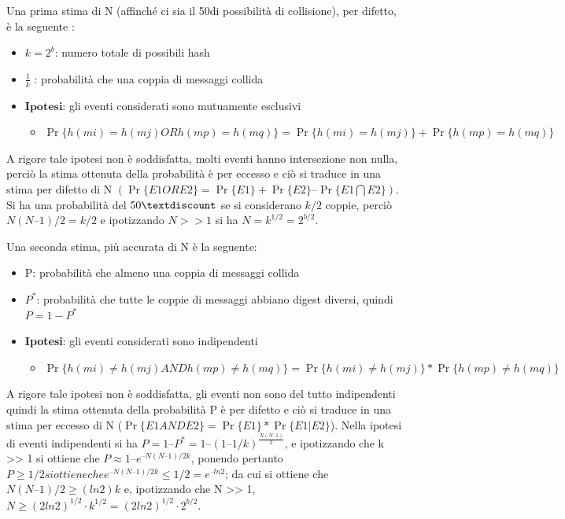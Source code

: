 Una prima stima di N (affinché ci sia il 50\textdiscount di possibilità di collisione), per difetto, è la seguente :
\begin{itemize}
\item $k = 2^{b}$: numero totale di possibili hash
\item $\frac{1}{k}$ : probabilità che una coppia di messaggi collida
\item $\textbf{Ipotesi}$: gli eventi considerati sono mutuamente esclusivi 
	\begin{itemize}
		\item $\Pr\{h(mi) = h(mj) \textit{OR} h(mp) = h(mq)\} = \Pr\{h(mi) = h(mj)\} + \Pr\{ h(mp) = h(mq)\}$
	\end{itemize}
\end{itemize}
 
A rigore tale ipotesi non è soddisfatta, molti eventi hanno intersezione non nulla, perciò la stima ottenuta della probabilità è per eccesso e ciò si traduce in una stima per difetto di N $(\Pr\{E1 OR E2\} = \Pr\{E1\} + \Pr\{E2\} – \Pr\{E1 \bigcap E2\})$.
Si ha una probabilità del $50\textdiscount$ se si considerano $k/2$ coppie, perciò $N(N – 1)/2 = k/2$ e ipotizzando $N >> 1$ si ha $N = k^{1/2} = 2^{b/2}$.

Una seconda stima, più accurata di N è la seguente:
\begin{itemize}
\item P: probabilità che almeno una coppia di messaggi collida
\item $P^{*}$: probabilità che tutte le coppie di messaggi abbiano digest diversi, quindi $P = 1 - P^{*}$
\item \textbf{Ipotesi}: gli eventi considerati sono indipendenti
	\begin{itemize}
		\item $\Pr\{h(mi) \neq h(mj) \textit{AND} h(mp) \neq h(mq)\} = \Pr\{h(mi) \neq h(mj)\} * \Pr\{ h(mp) \neq h(mq)\}$
	\end{itemize}
\end{itemize}

A rigore tale ipotesi non è soddisfatta, gli eventi non sono del tutto indipendenti quindi la stima ottenuta della probabilità P è per difetto e ciò si traduce in una stima per eccesso di N ($\Pr\{E1 AND E2\} = \Pr\{E1\} * \Pr\{E1|E2\}$).
Nella ipotesi di eventi indipendenti si ha $P = 1 – P^{*} = 1 – (1 – 1/k)^{\frac{N(N – 1)}{2}}$, e ipotizzando che k >> 1 si ottiene che $P \approx 1 – e^{– N(N – 1)/2k}$, ponendo pertanto $P\geq1/2 si ottiene che e^{– N(N – 1)/2k} \leqslant 1/2 = e^{–ln2}$; da cui si ottiene che $N(N – 1)/2 \geq (ln2)k$ e, ipotizzando che N >> 1, $N \geqslant (2ln2)^{1/2} \cdot k^{1/2} = (2ln2)^{1/2} \cdot 2^{b/2}$.

